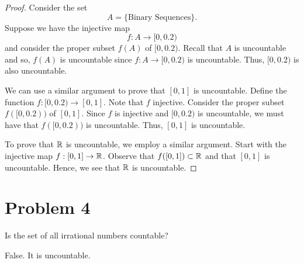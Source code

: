 \documentclass[11pt,a4paper]{article}
\begin{document}
\begin{proof}
Consider the set
\[ A = \{ \text{Binary Sequences} \}. \]
Suppose we have the injective map  
\[  f: A   \to [0,0.2) \]
and consider the proper subset \( f(A)  \) of \( [0,0.2) \). Recall that \( A  \) is uncountable and so, \( f(A)  \) is uncountable since \( f: A \to [0,0.2) \) is uncountable. Thus, \( [0,0.2) \) is also uncountable. 


We can use a similar argument to prove that \( [0,1] \) is uncountable. Define the function \( f: [0,0.2) \to [0,1] \). Note that \( f  \) injective. Consider the proper subset \( f([0,0.2))  \) of \( [0,1] \). Since \( f  \) is injective and \( [0,0.2) \) is uncountable, we must have that \( f([0,0.2)) \) is uncountable. Thus, \( [0,1] \) is uncountable.

To prove that \( \mathbb{R}  \) is uncountable, we employ a similar argument. Start with the injective map \( f : [0,1] \to \mathbb{R}  \). Observe that \( f([0,1]) \subset \mathbb{R}  \) and that \( [0,1] \) is uncountable. Hence, we see that \( \mathbb{R}  \) is uncountable.  
\end{proof}

\section*{Problem 4} Is the set of all irrational numbers countable?
\begin{solution}
False. It is uncountable.
\end{solution}
\end{document}
